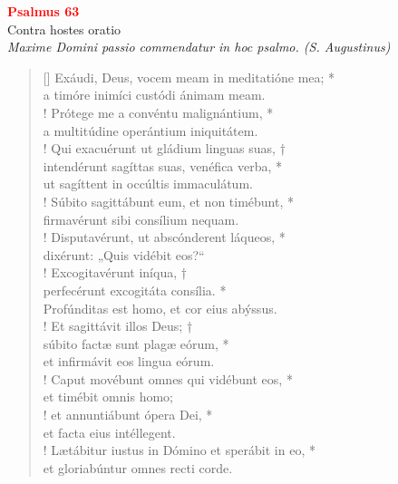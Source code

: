 


\def\greinitialformat#1{%
{\fontsize{39}{39}\selectfont #1}%
}




\vspace{0.3cm}
\begin{center}
 \textcolor{red}{\large \bf Psalmus 63}\\
Contra hostes oratio\\
\textit{\small Maxime Domini passio commendatur in hoc psalmo. (S. Augustinus)}
\end{center}
\begin{verse}[\versewidth]
Exáudi, Deus, vocem meam in meditatióne mea; *\\
a timóre inimíci custódi ánimam meam.\\!
\vin Prótege me a convéntu malignántium, *\\
\vin a multitúdine operántium iniquitátem.\\!
Qui exacuérunt ut gládium linguas suas, †\\
intendérunt sagíttas suas, venéfica verba, *\\
ut sagíttent in occúltis immaculátum.\\!
\vin Súbito sagittábunt eum, et non timébunt, *\\
\vin firmavérunt sibi consílium nequam.\\!
Disputavérunt, ut abscónderent láqueos, *\\
dixérunt: „Quis vidébit eos?“\\!
\vin Excogitavérunt iníqua, †\\
\vin perfecérunt excogitáta consília. *\\
\vin Profúnditas est homo, et cor eius abýssus.\\!
Et sagittávit illos Deus; †\\
súbito factæ sunt plagæ eórum, *\\
et infirmávit eos lingua eórum.\\!
\vin Caput movébunt omnes qui vidébunt eos, *\\
\vin et timébit omnis homo;\\!
et annuntiábunt ópera Dei, *\\
et facta eius intéllegent.\\!
\vin Lætábitur iustus in Dómino et sperábit in eo, *\\
\vin et gloriabúntur omnes recti corde.\\
\end{verse}
\vspace{1cm}


